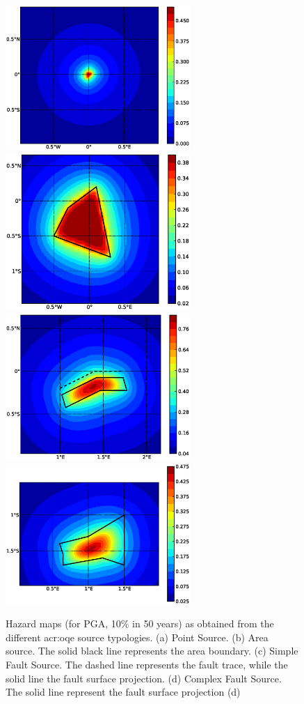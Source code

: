 \begin{figure} 
\centering 
\subcaptionbox{}
{\includegraphics[width=7cm]{./figures/hazard/point.eps}} 
\subcaptionbox{}
{\includegraphics[width=7cm]{./figures/hazard/area.eps}} 
\subcaptionbox{}
{\includegraphics[width=7cm]{./figures/hazard/simple_fault.eps}} 
\subcaptionbox{}
{\includegraphics[width=7cm]{./figures/hazard/complex_fault.eps}} 
\caption{Hazard maps (for PGA, 10\% in 50 years) as obtained from the different \gls{acr:oqe} source typologies. (a) Point Source. (b) Area source. 
The solid black line represents the area boundary. (c) Simple Fault Source. The dashed line represents the fault trace, while the solid line the fault
surface projection. (d) Complex Fault Source. The solid line represent the fault surface projection (d)}
\label{fig:hazard_maps1}
\end{figure}

